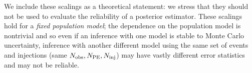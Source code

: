 We include these scalings as a theoretical statement: we stress that they should not be used to evaluate the reliability of a posterior estimator. These scalings hold for a \textit{fixed population model}; the dependence on the population model is nontrivial and so even if an inference with one model is stable to Monte Carlo uncertainty, inference with another different model using the same set of events and injections (same $N_{\rm obs}, N_{\rm PE}, N_{\rm inj}$) may have vastly different error statistics and may not be reliable. 







